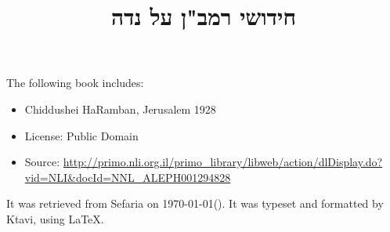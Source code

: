 \documentclass[12pt, openany]{book}
\newcommand{\texttitle}{חידושי רמב"ן על נדה}\usepackage{titlesec}
\begin{document}
\frontmatter
{}

\title{\texttitle}

\author{}

\date{}

\maketitle

\begin{minipage}[b][\textheight][b]{\textwidth}\englishfont	
	\begin{english}
		\vfill
		The following book includes:
\begin{itemize}
\item Chiddushei HaRamban, Jerusalem 1928
\item License: Public Domain
\item Source: \url{http://primo.nli.org.il/primo_library/libweb/action/dlDisplay.do?vid=NLI&docId=NNL_ALEPH001294828}
\end{itemize}
		It was retrieved from Sefaria on \today\space \texthebrew{(\Hebrewtoday)}.  It was typeset and formatted by Ktavi, using \LaTeX .
		\clearpage
		
	\end{english}
\end{minipage}


\tableofcontents

\clearpage
\mainmatter
{}
\end{document}
